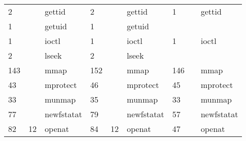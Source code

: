 \documentclass[submit,techreq,noauthor]{eco}	%
\begin{document}
\begin{table*}[t]
\begin{tabular}{|lllllllll|}
  \multicolumn{1}{|l|}{2}     & \multicolumn{1}{l|}{}       & \multicolumn{1}{l|}{gettid}            & \multicolumn{1}{l|}{2}     & \multicolumn{1}{l|}{}       & \multicolumn{1}{l|}{gettid}            & \multicolumn{1}{l|}{1}     & \multicolumn{1}{l|}{}       & gettid            \\
  \multicolumn{1}{|l|}{1}     & \multicolumn{1}{l|}{}       & \multicolumn{1}{l|}{getuid}            & \multicolumn{1}{l|}{1}     & \multicolumn{1}{l|}{}       & \multicolumn{1}{l|}{getuid}            & \multicolumn{1}{l|}{}      & \multicolumn{1}{l|}{}       &                   \\
  \multicolumn{1}{|l|}{1}     & \multicolumn{1}{l|}{}       & \multicolumn{1}{l|}{ioctl}             & \multicolumn{1}{l|}{1}     & \multicolumn{1}{l|}{}       & \multicolumn{1}{l|}{ioctl}             & \multicolumn{1}{l|}{1}     & \multicolumn{1}{l|}{}       & ioctl             \\
  \multicolumn{1}{|l|}{2}     & \multicolumn{1}{l|}{}       & \multicolumn{1}{l|}{lseek}             & \multicolumn{1}{l|}{2}     & \multicolumn{1}{l|}{}       & \multicolumn{1}{l|}{lseek}             & \multicolumn{1}{l|}{}      & \multicolumn{1}{l|}{}       &                   \\
  \multicolumn{1}{|l|}{143}   & \multicolumn{1}{l|}{}       & \multicolumn{1}{l|}{mmap}              & \multicolumn{1}{l|}{152}   & \multicolumn{1}{l|}{}       & \multicolumn{1}{l|}{mmap}              & \multicolumn{1}{l|}{146}   & \multicolumn{1}{l|}{}       & mmap              \\
  \multicolumn{1}{|l|}{43}    & \multicolumn{1}{l|}{}       & \multicolumn{1}{l|}{mprotect}          & \multicolumn{1}{l|}{46}    & \multicolumn{1}{l|}{}       & \multicolumn{1}{l|}{mprotect}          & \multicolumn{1}{l|}{45}    & \multicolumn{1}{l|}{}       & mprotect          \\
  \multicolumn{1}{|l|}{33}    & \multicolumn{1}{l|}{}       & \multicolumn{1}{l|}{munmap}            & \multicolumn{1}{l|}{35}    & \multicolumn{1}{l|}{}       & \multicolumn{1}{l|}{munmap}            & \multicolumn{1}{l|}{33}    & \multicolumn{1}{l|}{}       & munmap            \\
  \multicolumn{1}{|l|}{77}    & \multicolumn{1}{l|}{}       & \multicolumn{1}{l|}{newfstatat}        & \multicolumn{1}{l|}{79}    & \multicolumn{1}{l|}{}       & \multicolumn{1}{l|}{newfstatat}        & \multicolumn{1}{l|}{57}    & \multicolumn{1}{l|}{}       & newfstatat        \\
  \multicolumn{1}{|l|}{82}    & \multicolumn{1}{l|}{12}     & \multicolumn{1}{l|}{openat}            & \multicolumn{1}{l|}{84}    & \multicolumn{1}{l|}{12}     & \multicolumn{1}{l|}{openat}            & \multicolumn{1}{l|}{47}    & \multicolumn{1}{l|}{}       & openat            \\

\end{tabular}
\end{table*}
\end{document}
